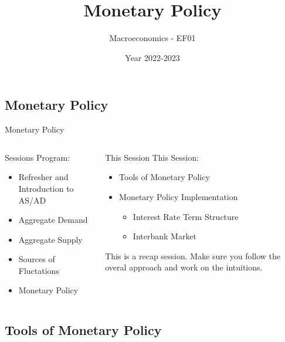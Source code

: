 \documentclass[
  ignorenonframetext,
  aspectratio=169,
]{beamer}
\title{Monetary Policy}
\subtitle{Macroeconomics - EF01}
\author{Year 2022-2023}
\date{}
\providecommand{\tightlist}{%
  \setlength{\itemsep}{0pt}\setlength{\parskip}{0pt}}\usepackage{longtable,booktabs,array}
\begin{document}
\frame{\titlepage}
\subsection{Monetary Policy}\label{monetary-policy}

\begin{frame}{Monetary Policy}
\begin{columns}[T]
\begin{column}{0.48\textwidth}
\begin{frame}{Sessions Program:}
\label{sessions-program}
\begin{itemize}
\tightlist
\item
  Refresher and Introduction to AS/AD
\item
  Aggregate Demand
\item
  Aggregate Supply
\item
  Sources of Fluctations
\item
  Monetary Policy
\end{itemize}
\end{frame}
\end{column}

\begin{column}{0.48\textwidth}
\begin{frame}{This Session}
\label{this-session}
This Session:

\begin{itemize}
\tightlist
\item
  Tools of Monetary Policy
\item
  Monetary Policy Implementation

  \begin{itemize}
  \tightlist
  \item
    Interest Rate Term Structure
  \item
    Interbank Market
  \end{itemize}
\end{itemize}

This is a recap session. Make sure you follow the overal approach and
work on the intuitions.
\end{frame}
\end{column}
\end{columns}
\end{frame}

\subsection{Tools of Monetary Policy}\label{tools-of-monetary-policy}
\end{document}
